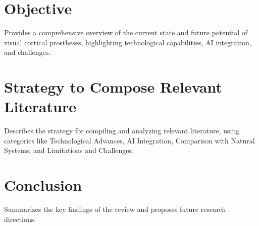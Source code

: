 \documentclass[twocolumn,10pt]{article}
\begin{document}
\section{Objective}\label{sec:objective}
Provides a comprehensive overview of the current state and future potential of
visual cortical prostheses, highlighting technological capabilities, AI
integration, and challenges.

\section{Strategy to Compose Relevant Literature}\label{sec:strategy}
Describes the strategy for compiling and analyzing relevant literature, using
categories like Technological Advances, AI Integration, Comparison with Natural
Systems, and Limitations and Challenges.

\section{Conclusion}\label{sec:conclusion}
Summarizes the key findings of the review and proposes future research
directions.

\printbibliography%
\end{document}
